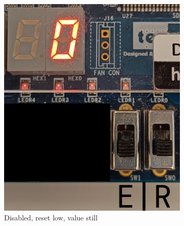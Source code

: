 \documentclass{article}
\begin{document}
\clearpage
\begin{figure}[h]
    \centering
    \begin{subfigure}[t]{0.45\textwidth}
        \centering
        \includegraphics[width=1\textwidth]{Figures/Part3_1.jpg}
        \caption{Disabled, reset low, value still}
        \label{fig:p3_1}
    \end{subfigure}
    \hfill
    \begin{subfigure}[t]{0.45\textwidth}
        \centering

\end{subfigure}
\end{figure}
\end{document}
